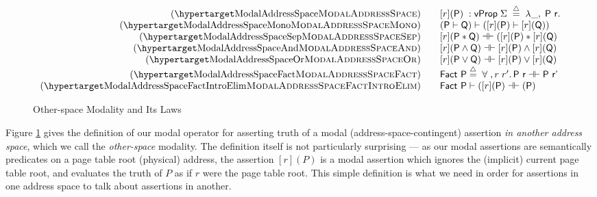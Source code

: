 \begin{figure}
\[
  \begin{array}{r@{\qquad}l}
    \hbox{(\TirNameStyle{ModalAddressSpace})} &
         [r](\mathsf{P}) \;: \mathsf{vProp} \; \Sigma \; \stackrel{\triangle}{=} \; \lambda \_,\; \mathsf{P}~\mathsf{r}.\\
    \hbox{(\TirNameStyle{ModalAddressSpaceMono})} & (\textsf{P} \vdash \textsf{Q}) \vdash  ([r](\textsf{P}) \vdash  [r](\textsf{Q}))\\
    \hbox{(\TirNameStyle{ModalAddressSpaceSep})} & [r](\textsf{P} \ast \textsf{Q}) \dashv\vdash ([r](\textsf{P}) \ast [r](\textsf{Q})\\
    \hbox{(\TirNameStyle{ModalAddressSpaceAnd})} &   [r](\textsf{P}\land \textsf{Q}) \dashv\vdash [r](\textsf{P})\land [r](\textsf{Q})\\    
    \hbox{(\TirNameStyle{ModalAddressSpaceOr})} &    [r](\textsf{P}\lor \textsf{Q}) \dashv\vdash [r](\textsf{P})\lor [r](\textsf{Q})\\   
    \hbox{(\TirNameStyle{ModalAddressSpaceFact})} &  \textsf{Fact P} \stackrel{\triangle}{=} \;\forall \; ,r \; r' \ldotp  \textsf{P r} \dashv\vdash \textsf{P r'}\\
    \hbox{(\TirNameStyle{ModalAddressSpaceFactIntroElim})} 
    &\textsf{Fact P} \vdash  ([r](\textsf{P}) \dashv\vdash (\textsf{P}) %
  \end{array}
  \]
  \caption{Other-space Modality and Its Laws}
  \label{fig:modaldef}
  \end{figure}
Figure \ref{fig:modaldef} gives the definition of our modal operator for asserting truth of a modal
(address-space-contingent) assertion \emph{in another address space}, which we call
the \emph{other-space} modality. The definition itself is not
particularly surprising --- as our modal assertions are semantically predicates on a page table root (physical)
address, the assertion $[r](P)$ is a modal assertion which ignores the (implicit) current page table root,
and evaluates the truth of $P$ as if $r$ were the page table root. This simple definition is 
what we need in order for assertions in one address space to talk about assertions in another.


